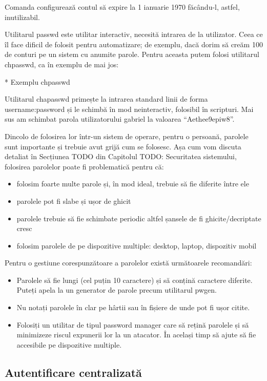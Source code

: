 Comanda configurează contul să expire la 1 ianuarie 1970 făcându-l, astfel,
inutilizabil.

Utilitarul passwd este utilitar interactiv, necesită intrarea de la utilizator.
Ceea ce îl face dificil de folosit pentru automatizare; de exemplu, dacă dorim
să creăm 100 de conturi pe un sistem cu anumite parole. Pentru aceasta putem
folosi utilitarul chpasswd, ca în exemplu de mai jos:

* Exemplu chpasswd

Utilitarul chapasswd primește la intrarea standard linii de forma
username:password și le schimbă în mod neinteractiv, folosibil în scripturi. Mai
sus am schimbat parola utilizatorului gabriel la valoarea “Aethee9epiw8”.

Dincolo de folosirea lor într-un sistem de operare, pentru o persoană, parolele
sunt importante și trebuie avut grijă cum se folosesc. Așa cum vom discuta
detaliat în Secțiunea TODO din Capitolul TODO: Securitatea sistemului, folosirea
parolelor poate fi problematică pentru că:

\begin{itemize}
	\item folosim foarte multe parole și, în mod ideal, trebuie să fie
		diferite între ele
	\item parolele pot fi slabe și ușor de ghicit
	\item parolele trebuie să fie schimbate periodic altfel șansele de fi
		ghicite/decriptate cresc
	\item folosim parolele de pe dispozitive multiple: desktop, laptop,
		dispozitiv mobil
\end{itemize}

Pentru o gestiune corespunzătoare a parolelor există următoarele recomandări:

\begin{itemize}
	\item Parolele să fie lungi (cel puțin 10 caractere) și să conțină
		caractere diferite. Puteți apela la un generator de parole
		precum utilitarul pwgen.
	\item Nu notați parolele în clar pe hârtii sau în fișiere de unde pot fi
		ușor citite.
	\item Folosiți un utilitar de tipul password manager care să rețină
		parolele și să minimizeze riscul expunerii lor la un atacator.
		În același timp să ajute să fie accesibile pe dispozitive
		multiple.
\end{itemize}

\subsection{Autentificare centralizată}
\label{sec:users-auth-central}

